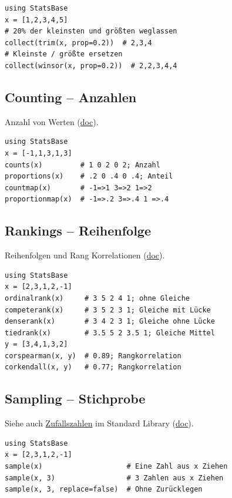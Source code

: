\documentclass[10pt,twocolumn]{scrartcl}
\begin{document}
\begin{lstlisting}
using StatsBase
x = [1,2,3,4,5]
# 20% der kleinsten und größten weglassen
collect(trim(x, prop=0.2))  # 2,3,4
# Kleinste / größte ersetzen
collect(winsor(x, prop=0.2))  # 2,2,3,4,4
\end{lstlisting}

\subsection{Counting -- Anzahlen}

Anzahl von Werten
(\href{https://juliastats.org/StatsBase.jl/stable/counts/}{doc}).

\begin{lstlisting}
using StatsBase
x = [-1,1,3,1,3]
counts(x)         # 1 0 2 0 2; Anzahl
proportions(x)    # .2 0 .4 0 .4; Anteil
countmap(x)       # -1=>1 3=>2 1=>2
proportionmap(x)  # -1=>.2 3=>.4 1 =>.4
\end{lstlisting}

\subsection{Rankings -- Reihenfolge}

Reihenfolgen und Rang Korrelationen
(\href{https://juliastats.org/StatsBase.jl/stable/ranking/}{doc}).

\begin{lstlisting}
using StatsBase
x = [2,3,1,2,-1]
ordinalrank(x)     # 3 5 2 4 1; ohne Gleiche
competerank(x)     # 3 5 2 3 1; Gleiche mit Lücke
denserank(x)       # 3 4 2 3 1; Gleiche ohne Lücke
tiedrank(x)        # 3.5 5 2 3.5 1; Gleiche Mittel
y = [3,4,1,3,2]
corspearman(x, y)  # 0.89; Rangkorrelation
corkendall(x, y)   # 0.77; Rangkorrelation
\end{lstlisting}

\subsection{Sampling -- Stichprobe}
\label{ssec:StatsBase_Sampling}

Siehe auch \hyperref[ssec:standardLibrary_Random]{Zufallszahlen} im Standard
Library (\href{https://juliastats.org/StatsBase.jl/stable/sampling/}{doc}).

\begin{lstlisting}
using StatsBase
x = [2,3,1,2,-1]
sample(x)                    # Eine Zahl aus x Ziehen
sample(x, 3)                 # 3 Zahlen aus x Ziehen
sample(x, 3, replace=false)  # Ohne Zurücklegen
\end{lstlisting}
\end{document}
